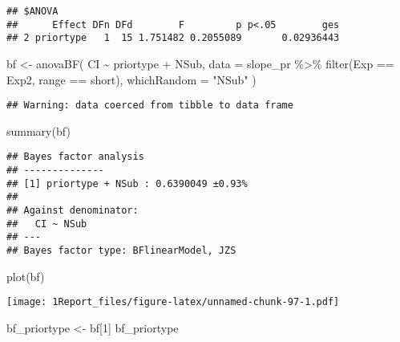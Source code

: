 \documentclass[
]{article}
\newenvironment{Shaded}{\begin{snugshade}}{\end{snugshade}}
\newcommand{\AttributeTok}[1]{\textcolor[rgb]{0.77,0.63,0.00}{#1}}
\newcommand{\DecValTok}[1]{\textcolor[rgb]{0.00,0.00,0.81}{#1}}
\newcommand{\FunctionTok}[1]{\textcolor[rgb]{0.00,0.00,0.00}{#1}}
\newcommand{\NormalTok}[1]{#1}
\newcommand{\OtherTok}[1]{\textcolor[rgb]{0.56,0.35,0.01}{#1}}
\newcommand{\SpecialCharTok}[1]{\textcolor[rgb]{0.00,0.00,0.00}{#1}}
\newcommand{\StringTok}[1]{\textcolor[rgb]{0.31,0.60,0.02}{#1}}
\begin{document}
\begin{verbatim}
## $ANOVA
##      Effect DFn DFd        F         p p<.05        ges
## 2 priortype   1  15 1.751482 0.2055089       0.02936443
\end{verbatim}

\begin{Shaded}
\begin{Highlighting}[]
\NormalTok{bf }\OtherTok{\textless{}{-}} \FunctionTok{anovaBF}\NormalTok{( CI }\SpecialCharTok{\textasciitilde{}}\NormalTok{ priortype }\SpecialCharTok{+}\NormalTok{ NSub, }\AttributeTok{data =}\NormalTok{  slope\_pr }\SpecialCharTok{\%\textgreater{}\%} \FunctionTok{filter}\NormalTok{(Exp }\SpecialCharTok{==} \StringTok{\textquotesingle{}Exp2\textquotesingle{}}\NormalTok{, range }\SpecialCharTok{==} \StringTok{\textquotesingle{}short\textquotesingle{}}\NormalTok{), }\AttributeTok{whichRandom =} \StringTok{"NSub"}\NormalTok{ ) }
\end{Highlighting}
\end{Shaded}

\begin{verbatim}
## Warning: data coerced from tibble to data frame
\end{verbatim}

\begin{Shaded}
\begin{Highlighting}[]
\FunctionTok{summary}\NormalTok{(bf)}
\end{Highlighting}
\end{Shaded}

\begin{verbatim}
## Bayes factor analysis
## --------------
## [1] priortype + NSub : 0.6390049 ±0.93%
## 
## Against denominator:
##   CI ~ NSub 
## ---
## Bayes factor type: BFlinearModel, JZS
\end{verbatim}

\begin{Shaded}
\begin{Highlighting}[]
\FunctionTok{plot}\NormalTok{(bf)}
\end{Highlighting}
\end{Shaded}

\texttt{[image: 1Report\_files/figure-latex/unnamed-chunk-97-1.pdf]}

\begin{Shaded}
\begin{Highlighting}[]
\NormalTok{ bf\_priortype }\OtherTok{\textless{}{-}}\NormalTok{ bf[}\DecValTok{1}\NormalTok{]}
\NormalTok{ bf\_priortype}
\end{Highlighting}
\end{Shaded}
\end{document}
